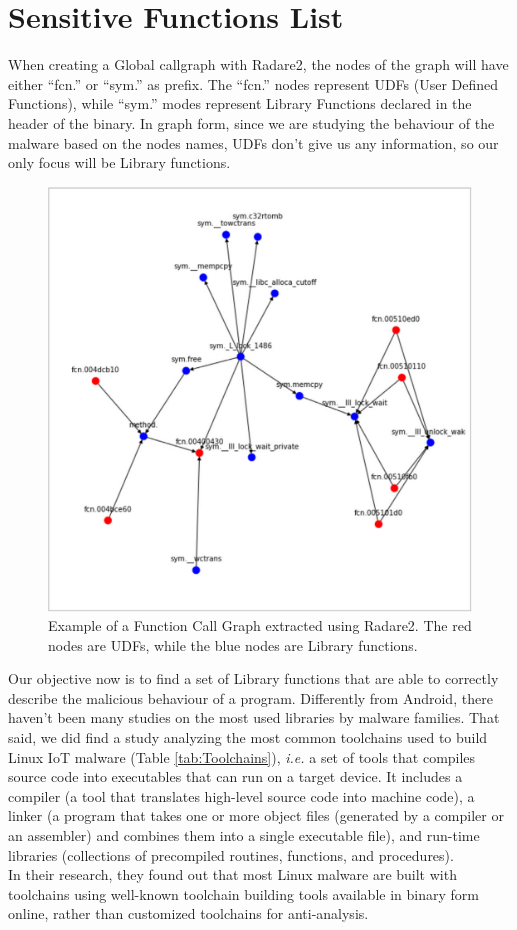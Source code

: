 \section{Sensitive Functions List}
When creating a Global callgraph with Radare2, the nodes of the graph will have either “fcn.” or “sym.” as prefix. The “fcn.” nodes represent UDFs (User Defined Functions), while “sym.” modes represent Library Functions declared in the header of the binary. In graph form, since we are studying the behaviour of the malware based on the nodes names, UDFs don't give us any information, so our only focus will be Library functions.

\begin{figure}[H]
    \centering
    \includegraphics[width=0.7\linewidth]{Images/ELFGraph.png}
    \caption{Example of a Function Call Graph extracted using Radare2. The red nodes are UDFs, while the blue nodes are Library functions.}
    \label{fig:ELFGraph}
\end{figure}

\noindent Our objective now is to find a set of Library functions that are able to correctly describe the malicious behaviour of a program. Differently from Android, there haven't been many studies on the most used libraries by malware families. That said, we did find a study \cite{akabane2021identification} analyzing the most common toolchains used to build Linux IoT malware (Table \ref{tab:Toolchains}), \textit{i.e.} a set of tools that compiles source code into executables that can run on a target device. It includes a compiler (a tool that translates high-level source code into machine code), a linker (a program that takes one or more object files (generated by a compiler or an assembler) and combines them into a single executable file), and run-time libraries (collections of precompiled routines, functions, and procedures). \\
In their research, they found out that most Linux malware are built with toolchains using well-known toolchain building tools available in binary form online, rather than customized toolchains for anti-analysis.

